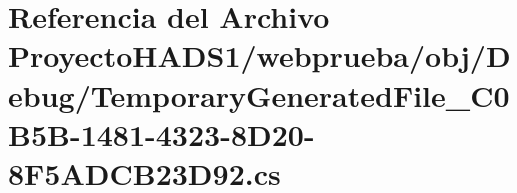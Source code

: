 \hypertarget{_proyecto_h_a_d_s1_2webprueba_2obj_2_debug_2_temporary_generated_file__036_c0_b5_b-1481-4323-8_d20-8_f5_a_d_c_b23_d92_8cs}{}\section{Referencia del Archivo Proyecto\+H\+A\+D\+S1/webprueba/obj/\+Debug/\+Temporary\+Generated\+File\+\_\+C0\+B5\+B-\/1481-\/4323-\/8\+D20-\/8\+F5\+A\+D\+C\+B23\+D92.cs}
\label{_proyecto_h_a_d_s1_2webprueba_2obj_2_debug_2_temporary_generated_file__036_c0_b5_b-1481-4323-8_d20-8_f5_a_d_c_b23_d92_8cs}
